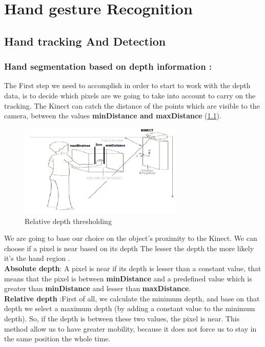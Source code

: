
\chapter{Hand gesture Recognition} \label{hgr}

\section{Hand tracking  And Detection}

\subsection{Hand segmentation based on depth information :} \label{depth}

The First step we need to accomplish in order to start to work with the depth data, is to decide which pixels are we going to take into account to carry on the tracking. The Kinect can catch the distance of the points which are visible to the camera, between the values \textbf{minDistance and maxDistance} (\ref{fig:cam8}).

\begin{figure}[H]
\centering
\includegraphics[width=0.7\textwidth]{img/mindistance.png}
\caption{Relative depth thresholding }
\label{fig:cam8}
\end{figure}

We are going to base our choice on the object’s proximity to the Kinect. We can choose if a pixel is near based on its depth  The lesser the depth the more likely it’s the hand region .\\\textbf{ Absolute depth}: A pixel is near if its depth is lesser than a constant value, that means that the pixel is between \textbf{minDistance }and a predefined value which is greater than \textbf{minDistance }and lesser than \textbf{maxDistance}.\\\textbf{Relative depth }:First of all,  we calculate the minimum depth, and  base on that depth we select a maximum depth (by adding a constant value to the minimum depth). So, if the depth is between these two values, the pixel is near. This method allow us to have greater mobility, because it does not force us to stay in the same position the whole time. 

